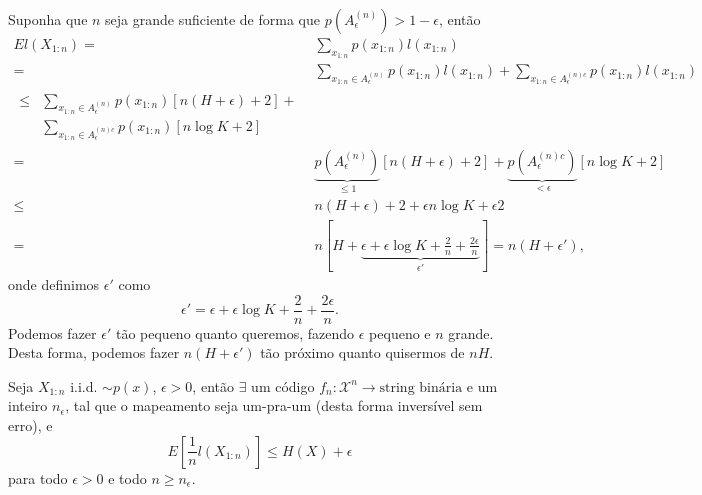 Suponha que $n$ seja grande suficiente de forma que $p(A_\epsilon^{(n)}) > 1 - \epsilon$, então
{\allowdisplaybreaks[4]
\begin{subequations}
  \begin{align}
    E l(X_{1:n}) ={}& \sum_{x_{1:n}} p(x_{1:n}) l(x_{1:n}) \\
                 ={}& \sum_{x_{1:n} \in A_\epsilon^{(n)}} p(x_{1:n}) l(x_{1:n}) + \sum_{x_{1:n} \in A_\epsilon^{(n)c}} p(x_{1:n}) l(x_{1:n}) \\
    \begin{split}             \leq{}& \sum_{x_{1:n} \in A_\epsilon^{(n)}} p(x_{1:n}) [n(H+\epsilon)+2] + \\
      & \sum_{x_{1:n} \in A_\epsilon^{(n)c}} p(x_{1:n}) [n \log K + 2] 
    \end{split} \\
                 ={}& \underbrace{p(A_\epsilon^{(n)})}_{\leq 1} [n(H+\epsilon)+2] + \underbrace{p(A_\epsilon^{(n)c})}_{< \epsilon} [n \log K + 2] \\
                 \leq{}& n(H+\epsilon)+2 + \epsilon n \log K + \epsilon 2 \\
                 ={}& n [H + \underbrace{\epsilon + \epsilon \log K + \frac{2}{n} + \frac{2 \epsilon}{n}}_{\epsilon'} ] = n(H+\epsilon') ,
  \end{align}
\end{subequations}
}
onde definimos $\epsilon'$ como
\begin{equation}
  \epsilon' = \epsilon + \epsilon \log K + \frac{2}{n} + \frac{2 \epsilon}{n} .
\end{equation}
Podemos fazer $\epsilon'$ tão pequeno quanto queremos, fazendo $\epsilon$ pequeno e $n$ grande.
Desta forma, podemos fazer $n(H+\epsilon')$ tão próximo quanto quisermos de $nH$.

\begin{theorem}
Seja $X_{1:n}$ i.i.d. $\sim p(x)$, $\epsilon > 0$, então $\exists$ um código $f_n : \mathcal{X}^n \rightarrow \text{string binária}$
e um inteiro $n_{\epsilon}$, tal que o mapeamento seja um-pra-um (desta forma inversível sem erro), e
      \begin{equation}
      E[ \frac{1}{n} l(X_{1:n})] \leq H(X) + \epsilon
      \end{equation}
para todo $\epsilon > 0$ e todo $n \geq n_{\epsilon}$.
\end{theorem}

